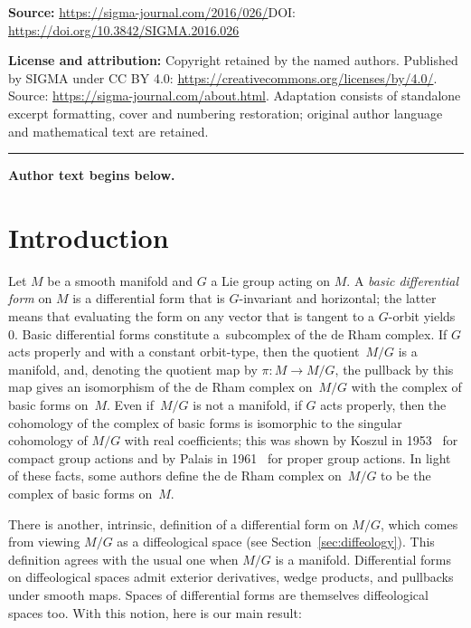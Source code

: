 \documentclass[11pt]{article}
\numberwithin{equation}{section}
\begin{document}
\noindent\textbf{Source:} \url{https://sigma-journal.com/2016/026/}\quad DOI: \url{https://doi.org/10.3842/SIGMA.2016.026}\par
\noindent\textbf{License and attribution:} Copyright retained by the named authors. Published by SIGMA under CC BY 4.0: \url{https://creativecommons.org/licenses/by/4.0/}. Source: \url{https://sigma-journal.com/about.html}. Adaptation consists of standalone excerpt formatting, cover and numbering restoration; original author language and mathematical text are retained.\par
\medskip\hrule\medskip\noindent\textbf{Author text begins below.}\par
\setcounter{section}{0}
\setcounter{subsection}{0}
\setcounter{subsubsection}{0}
\setcounter{Theorem}{0}
\setcounter{equation}{0}
\section{Introduction}\label{sec:intro}

Let $M$ be a smooth manifold and $G$ a Lie group acting on $M$.
A \emph{basic differential form} on $M$
is a dif\/ferential form that is $G$-invariant and horizontal;
the latter means that
evaluating the form on any vector that is tangent to a $G$-orbit yields $0$.
Basic dif\/ferential forms constitute a~subcomplex of the de Rham complex.
If $G$ acts properly and with a constant orbit-type, then the quotient~$M/G$ is a manifold,
and, denoting the quotient map by $\pi \colon M \to M/G$,
the pullback by this map
gives an isomorphism of the de Rham complex on~$M/G$
with the complex of basic forms on~$M$.
Even if~$M/G$ is not a manifold, if $G$ acts properly, then
the cohomology of the complex of basic forms
is isomorphic to the singular cohomology of $M/G$ with real coef\/f\/icients;
this was shown by Koszul in 1953~\cite{koszul} for compact group actions
and by Palais in 1961~\cite{palais} for proper group actions.
In light of these facts, some authors def\/ine the de Rham complex on~$M/G$
to be the complex of basic forms on~$M$.

There is another, intrinsic, def\/inition of a dif\/ferential form on $M/G$,
which comes from viewing $M/G$ as a dif\/feological space (see Section~\ref{sec:diffeology}). This def\/inition agrees with the usual one when $M/G$ is a manifold. Dif\/ferential forms on dif\/feological spaces
admit exterior derivatives,
wedge products, and pullbacks under smooth maps.
Spaces of dif\/ferential forms are themselves dif\/feological spaces too.
With this notion, here is our main result:
\end{document}

